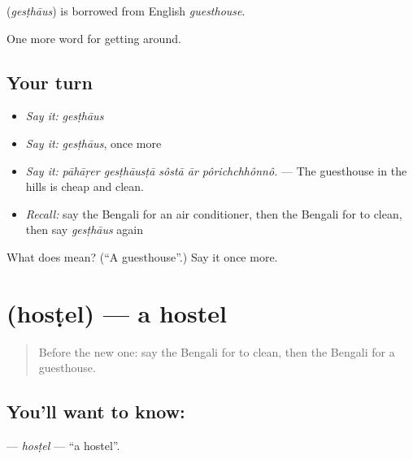 \begin{cousinweb}
\textbf{} (\emph{gesṭhāus}) is borrowed from English \emph{guesthouse}.
\end{cousinweb}

\begin{grammarlens}[title={What you've built}]
One more word for getting around.
\end{grammarlens}

\subsection*{Your turn}
\begin{itemize}
\raggedright
  \item \emph{Say it:} \emph{gesṭhāus}
  \item \emph{Say it:} \emph{gesṭhāus}, once more
  \item \emph{Say it:} \emph{pāhāṛer gesṭhāusṭā sôstā ār pôrichchhônnô.} — The guesthouse in the hills is cheap and clean.
  \item \emph{Recall:} say the Bengali for an air conditioner, then the Bengali for to clean, then say \emph{gesṭhāus} again
\end{itemize}

\begin{tcolorbox}[breakable,colback=teal!4,colframe=teal!35!black,title={Before you move on}]
What does  mean? (\textquotedblleft{}A guesthouse\textquotedblright{}.) Say it once more.
\end{tcolorbox}
\section[\texorpdfstring{\bn{হোস্টেল} (hosṭel)}{হোস্টেল (hosṭel)}]{ (hosṭel) — a hostel}

\label{lesson:BN-C406-hostel}



\begin{quote}
Before the new one: say the Bengali for to clean, then the Bengali for a guesthouse.
\end{quote}

\subsection*{You'll want to know: }
\textbf{} — \emph{hosṭel} — \textquotedblleft{}a hostel\textquotedblright{}.

\begin{quote}
   
\end{quote}

